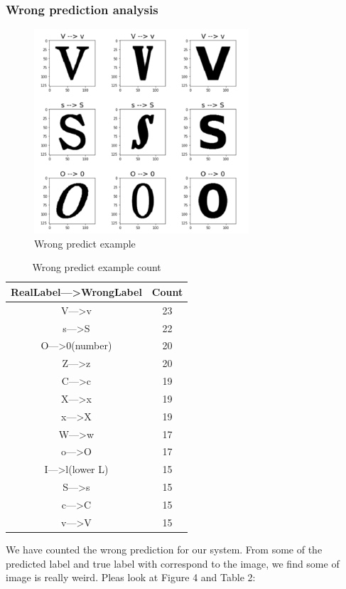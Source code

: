 \documentclass[twoside,twocolumn,10.8pt]{article}
\begin{document}
\subsubsection{Wrong prediction analysis}

\begin{figure}[h]
\includegraphics[width=8cm]{wront_pic_ana.png}
\centering
\caption{Wrong predict example}\label{fig4}
\end{figure}

\begin{table}[h]
\caption{Wrong predict example count}
\centering
\begin{tabular}{c|c}
\hline
RealLabel—>WrongLabel & Count\\
\hline
V—>v & 23 \\
s—>S & 22 \\
O—>0(number) & 20 \\
Z—>z & 20 \\
C—>c & 19 \\
X—>x & 19 \\
x—>X & 19 \\
W—>w & 17 \\
o—>O & 17 \\
I—>l(lower L) & 15 \\
S—>s & 15 \\
c—>C & 15 \\
v—>V & 15 \\
\hline
\end{tabular}
\label{table:1}
\end{table}

\noindent We have counted the wrong prediction for our system. From some of the predicted label and true label with correspond to the image, we find some of image is really weird. Pleas look at Figure 4 and Table 2:
\end{document}
